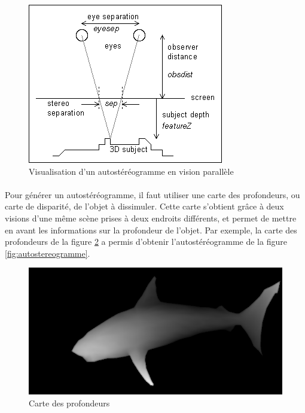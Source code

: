 \begin{figure}[H]
  \centering
  \includegraphics[scale=0.7]{./ppe_autostereogramme.png}
  \caption{Visualisation d’un autostéréogramme en vision parallèle \protect \footnotemark }
  \label{fig:ppe_autostereogramme}
\end{figure}


\paragraph{}
	Pour générer un autostéréogramme, il faut utiliser une carte des profondeurs, ou carte de disparité, de l’objet à dissimuler. Cette carte s’obtient grâce à deux visions d’une même scène prises à deux endroits différents, et permet de mettre en avant les informations sur la profondeur de l’objet. Par exemple, la carte des profondeurs de la figure \ref{fig:carteProfondeur} a permis d’obtenir l’autostéréogramme de la figure \ref{fig:autostereogramme}.

\begin{figure}[h]
		\centering
		\includegraphics[scale=0.4]{carteProfondeur.png}
		\caption{\label{fig:carteProfondeur} Carte des profondeurs \protect \footnotemark }
\end{figure}

